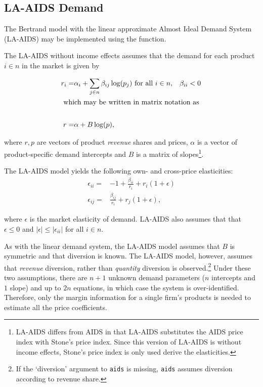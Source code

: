 \documentclass[11pt,numbers=noenddot,pointlessnumbers]{scrreprt}
\numberwithin{equation}{section}
\begin{document}
\subsection{LA-AIDS Demand}
The Bertrand model with the linear approximate Almost Ideal Demand System (LA-AIDS)  may be implemented using the
\verb@aids@ function.

The LA-AIDS without income effects assumes that the demand for each product $i
\in n$ in the market is given by

\begin{align*}
  r_i=& \alpha_i + \sum_{j\in n}\beta_{ij} \log(p_j) \mbox{ for all $i\in n$},& \beta_{ii}<0\\
  \intertext{ which may be written in matrix notation as }\\
  r=&\alpha + B\log(p),&
\end{align*}


where $r,p$ are vectors of product \emph{revenue} shares and prices, $\alpha$ is a vector of product-specific demand intercepts and
$B$ is a matrix of slopes\footnote{LA-AIDS differs from AIDS in that
  LA-AIDS substitutes the AIDS price index with Stone's price
  index. Since this version of LA-AIDS is without income effects,
  Stone's price index is only used derive the elasticities.}.

The LA-AIDS model yields the following own- and cross-price elasticities:
\begin{align*}
  \epsilon_{ii}=&-1 + \frac{\beta_{ii}}{r_i} + r_i(1+ \epsilon)  \\
  \epsilon_{ij}=&\frac{\beta_{ij}}{r_i} + r_j(1+ \epsilon),
\end{align*}

where $\epsilon$ is the market elasticity of demand. LA-AIDS  also
assumes that that
$\epsilon\le 0$ and $|\epsilon| \le |\epsilon_{ii}|$ for all $i \in n$.

As with the linear  demand system,
the LA-AIDS model assumes that $B$ is symmetric and that diversion is
known. The LA-AIDS model, however,
assumes that \emph{revenue} diversion, rather than \emph{quantity}
diversion is observed.\footnote{If the `diversion' argument to \texttt{aids}
  is missing, \texttt{aids} assumes diversion according to revenue
  share.} Under these two assumptions, there are $n+1$ unknown
demand parameters ($n$ intercepts and $1$ slope) and up to $2n$ equations,
in which case the system is over-identified. Therefore, only the
margin information for a single
firm's products is needed to estimate all the price coefficients.
\end{document}
